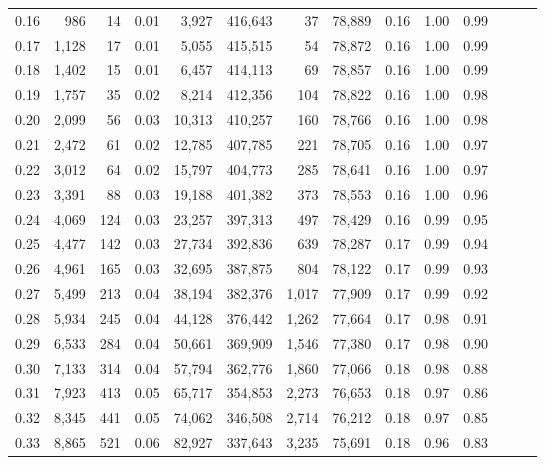 \begin{tabular}{rrrrrrrrrrrrrr}
0.16 &     986 &     14 &  0.01 &    3,927 &  416,643 &      37 &  78,889 &  0.16 &  1.00 &      0.99 \\
0.17 &   1,128 &     17 &  0.01 &    5,055 &  415,515 &      54 &  78,872 &  0.16 &  1.00 &      0.99 \\
0.18 &   1,402 &     15 &  0.01 &    6,457 &  414,113 &      69 &  78,857 &  0.16 &  1.00 &      0.99 \\
0.19 &   1,757 &     35 &  0.02 &    8,214 &  412,356 &     104 &  78,822 &  0.16 &  1.00 &      0.98 \\
0.20 &   2,099 &     56 &  0.03 &   10,313 &  410,257 &     160 &  78,766 &  0.16 &  1.00 &      0.98 \\
0.21 &   2,472 &     61 &  0.02 &   12,785 &  407,785 &     221 &  78,705 &  0.16 &  1.00 &      0.97 \\
0.22 &   3,012 &     64 &  0.02 &   15,797 &  404,773 &     285 &  78,641 &  0.16 &  1.00 &      0.97 \\
0.23 &   3,391 &     88 &  0.03 &   19,188 &  401,382 &     373 &  78,553 &  0.16 &  1.00 &      0.96 \\
0.24 &   4,069 &    124 &  0.03 &   23,257 &  397,313 &     497 &  78,429 &  0.16 &  0.99 &      0.95 \\
0.25 &   4,477 &    142 &  0.03 &   27,734 &  392,836 &     639 &  78,287 &  0.17 &  0.99 &      0.94 \\
0.26 &   4,961 &    165 &  0.03 &   32,695 &  387,875 &     804 &  78,122 &  0.17 &  0.99 &      0.93 \\
0.27 &   5,499 &    213 &  0.04 &   38,194 &  382,376 &   1,017 &  77,909 &  0.17 &  0.99 &      0.92 \\
0.28 &   5,934 &    245 &  0.04 &   44,128 &  376,442 &   1,262 &  77,664 &  0.17 &  0.98 &      0.91 \\
0.29 &   6,533 &    284 &  0.04 &   50,661 &  369,909 &   1,546 &  77,380 &  0.17 &  0.98 &      0.90 \\
0.30 &   7,133 &    314 &  0.04 &   57,794 &  362,776 &   1,860 &  77,066 &  0.18 &  0.98 &      0.88 \\
0.31 &   7,923 &    413 &  0.05 &   65,717 &  354,853 &   2,273 &  76,653 &  0.18 &  0.97 &      0.86 \\
0.32 &   8,345 &    441 &  0.05 &   74,062 &  346,508 &   2,714 &  76,212 &  0.18 &  0.97 &      0.85 \\
0.33 &   8,865 &    521 &  0.06 &   82,927 &  337,643 &   3,235 &  75,691 &  0.18 &  0.96 &      0.83 \\

\end{tabular}
